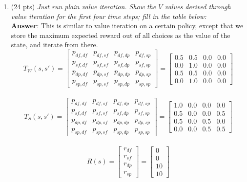 \documentclass[fleqn]{hw4}
\begin{document}
\begin{enumerate}
\item(24 pts) \textit{Just run plain value iteration.  Show the $V$ values derived through value iteration for the first four time steps; 
fill in the table below:} \\
\textbf{Answer}: This is similar to value iteration on a certain policy, except that we store the maximum expected reward out of all
choices as the value of the state, and iterate from there.
$$ T_{W}(s,s') = \begin{bmatrix}
p_{df,df} & p_{df,sf} & p_{df,dp} & p_{df,sp} \\
p_{sf,df} & p_{sf,sf} & p_{sf,dp} & p_{sf,sp} \\
p_{dp,df} & p_{dp,sf} & p_{dp,dp} & p_{dp,sp} \\
p_{sp,df} & p_{sp,sf} & p_{sp,dp} & p_{sp,sp} 
\end{bmatrix} = \begin{bmatrix}
0.5 & 0.5 & 0.0 & 0.0 \\
0.0 & 1.0 & 0.0 & 0.0 \\
0.5 & 0.5 & 0.0 & 0.0 \\
0.0 & 1.0 & 0.0 & 0.0
\end{bmatrix} $$\\
$$T_{S}(s,s') = \begin{bmatrix}
	p_{df,df} & p_{df,sf} & p_{df,dp} & p_{df,sp} \\
	p_{sf,df} & p_{sf,sf} & p_{sf,dp} & p_{sf,sp} \\
	p_{dp,df} & p_{dp,sf} & p_{dp,dp} & p_{dp,sp} \\
	p_{sp,df} & p_{sp,sf} & p_{sp,dp} & p_{sp,sp} 
\end{bmatrix} = \begin{bmatrix}
1.0 & 0.0 & 0.0 & 0.0 \\
0.5 & 0.0 & 0.0 & 0.5 \\
0.5 & 0.0 & 0.5 & 0.0 \\
0.0 & 0.0 & 0.5 & 0.5
\end{bmatrix} $$\\
$$ R(s) = \begin{bmatrix}
r_{df} \\
r_{sf} \\
r_{dp} \\
r_{sp} 
\end{bmatrix} = \begin{bmatrix}
0 \\
0 \\
10 \\
10 
\end{bmatrix}  $$


\end{enumerate}
\end{document}
